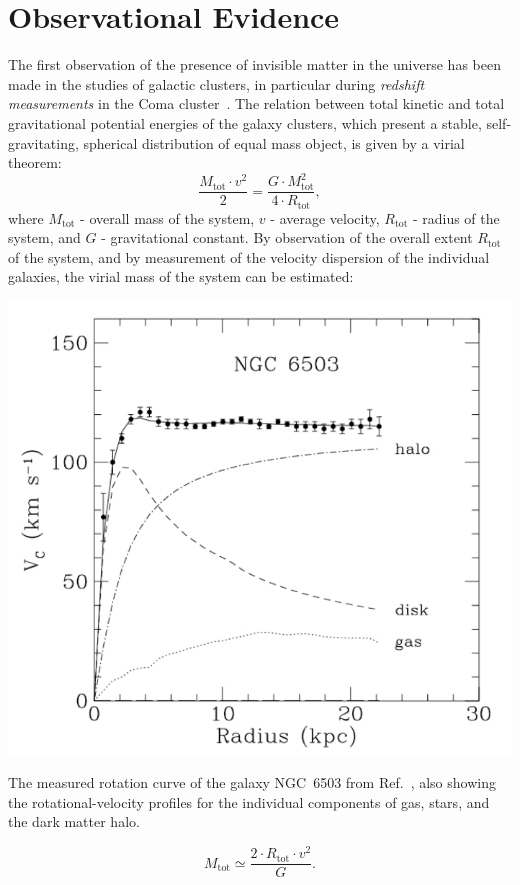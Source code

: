 \section{Observational Evidence}
\label{secObservationalEvidence}

The first observation of the presence of invisible matter in the universe has been made in the studies of galactic clusters, in particular during {\it redshift measurements} in the Coma cluster~\cite{RotationCurves_Zwicky1, RotationCurves_Zwicky2}. The relation between total kinetic and total gravitational potential energies of the galaxy clusters, which present a stable, self-gravitating, spherical distribution of equal mass object, is given by a virial theorem:
\begin{equation}
\label{eqVirialTheorem}
\frac{M_{\mathrm{tot}} \cdot v^{2}}{2} = \frac{G \cdot M_{\mathrm{tot}}^{2}}{4 \cdot R_{\mathrm{tot}}},
\end{equation}
where $M_{\mathrm{tot}}$ - overall mass of the system, $v$ - average velocity, $R_{\mathrm{tot}}$ - radius of the system, and $G$ - gravitational constant. By observation of the overall extent $R_{\mathrm{tot}}$ of the system, and by measurement of the velocity dispersion of the individual galaxies, the virial mass of the system can be estimated:
\begin{floatingfigure}[r]{0.4\textwidth}
\centering
\includegraphics[width=0.4\linewidth]{plots/DarkMatter/RotationCurve_NGC6503.png}
\caption[The rotation curve of galaxy NGC~6503]{The measured rotation curve of the galaxy NGC~6503 from Ref.~\cite{RotationCurves_Begeman}, also showing the rotational-velocity profiles for the individual components of gas, stars, and the dark matter halo.}
\label{figRotationCurve}
\end{floatingfigure}

\begin{equation}
\label{eqVirialMass}
M_{\mathrm{tot}} \simeq \frac{2 \cdot R_{\mathrm{tot}} \cdot v^{2}}{G}.
\end{equation}

